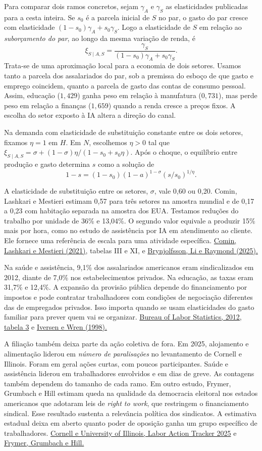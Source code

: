 \documentclass[11pt,a4paper]{article}
\newcommand{\subtitulo}[1]{\par\smallskip{\large\bfseries\color{azul}#1\par}\nobreak}
\newcommand{\clm}{\href{https://dcomin.host.dartmouth.edu/Publications_files/ECTA16317.pdf}{Comin, Lashkari e Mestieri (2021)}}
\newcommand{\blsdoze}{\href{https://www.bls.gov/news.release/archives/union2_01232013.htm}{Bureau of Labor Statistics, 2012, tabela 3}}
\newcommand{\cornell}{\href{https://www.ilr.cornell.edu/faculty-and-research/labor-action-tracker-2025}{Cornell e University of Illinois, Labor Action Tracker 2025}}
\begin{document}
Para comparar dois ramos concretos, sejam \(\gamma_A\) e \(\gamma_S\) as elasticidades publicadas para a cesta inteira. Se \(s_0\) é a parcela inicial de \(S\) no par, o gasto do par cresce com elasticidade \((1-s_0)\gamma_A+s_0\gamma_S\). Logo a elasticidade de \(S\) em relação ao \emph{suborçamento do par}, ao longo da mesma variação de renda, é
\[
 \xi_{S\mid A,S}=\frac{\gamma_S}{(1-s_0)\gamma_A+s_0\gamma_S}.
\]
Trata-se de uma aproximação local para a economia de dois setores. Usamos tanto a parcela dos assalariados do par, sob a premissa do esboço de que gasto e emprego coincidem, quanto a parcela de gasto das contas de consumo pessoal. Assim, educação (\(1{,}429\)) ganha peso em relação à manufatura (\(0{,}731\)), mas perde peso em relação a finanças (\(1{,}659\)) quando a renda cresce a preços fixos. A escolha do setor exposto à IA altera a direção do canal.

Na demanda com elasticidade de substituição constante entre os dois setores, fixamos \(\eta=1\) em \(H\). Em \(N\), escolhemos \(\eta>0\) tal que \(\xi_{S\mid A,S}=\sigma+(1-\sigma)\eta/(1-s_0+s_0\eta)\). Após o choque, o equilíbrio entre produção e gasto determina \(s\) como a solução de
\[
 1-s=(1-s_0)(1-a)^{1-\sigma}(s/s_0)^{1/\eta}.
\]

A elasticidade de substituição entre os setores, \(\sigma\), vale 0,60 ou 0,20. Comin, Lashkari e Mestieri estimam 0,57 para três setores na amostra mundial e de 0,17 a 0,23 com habitação separada na amostra dos EUA. Testamos reduções do trabalho por unidade de 36\% e 13,04\%. O segundo valor equivale a produzir 15\% mais por hora, como no estudo de assistência por IA em atendimento ao cliente. Ele fornece uma referência de escala para uma atividade específica. \clm, tabelas III e XI, e \href{https://doi.org/10.1093/qje/qjae044}{Brynjolfsson, Li e Raymond (2025).}

\subtitulo{Quem emprega e quem negocia}
Na saúde e assistência, 9,1\% dos assalariados americanos eram sindicalizados em 2012, diante de 7,0\% nos estabelecimentos privados. Na educação, as taxas eram 31,7\% e 12,4\%. A expansão da provisão pública depende do financiamento por impostos e pode contratar trabalhadores com condições de negociação diferentes das de empregados privados. Isso importa quando se usam elasticidades do gasto familiar para prever quem vai se organizar. \blsdoze{} e \href{https://doi.org/10.1017/S0043887100007358}{Iversen e Wren (1998).}

A filiação também deixa parte da ação coletiva de fora. Em 2025, alojamento e alimentação liderou em \emph{número de paralisações} no levantamento de Cornell e Illinois. Foram em geral ações curtas, com poucos participantes. Saúde e assistência liderou em trabalhadores envolvidos e em dias de greve. As contagens também dependem do tamanho de cada ramo. Em outro estudo, Frymer, Grumbach e Hill estimam queda na qualidade da democracia eleitoral nos estados americanos que adotaram leis de \emph{right to work}, que restringem o financiamento sindical. Esse resultado sustenta a relevância política dos sindicatos. A estimativa estadual deixa em aberto quanto poder de oposição ganha um grupo específico de trabalhadores. \cornell{} e \href{https://doi.org/10.1017/S1537592724001427}{Frymer, Grumbach e Hill.}
\end{document}
